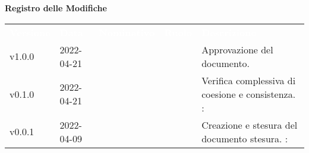 

{\LARGE{\textbf{Registro delle Modifiche}}} \\
\begin{table}[!htbp]
\renewcommand{\arraystretch}{1.5}
\begin{tabular}{ m{}<{\centering}  m{}<{\centering}  m{}<{\centering}  m{}<{\centering}  m{}<{\centering} }
	\rowcolor{darkblue}
	\textcolor{white}{\textbf{Versione}} &\textcolor{white}{\textbf{Data}}& \textcolor{white}{\textbf{Nominativo}} & \textcolor{white}{\textbf{Ruolo}}&\textcolor{white}{\textbf{Descrizione}}\\ 

	v1.0.0 & 2022-04-21 & \FP & \RE & Approvazione del documento. \\

	v0.1.0& 2022-04-21 & \PV & \AN & Verifica complessiva di coesione e consistenza.  \VE: \textit{\GC}\\

	v0.0.1& 2022-04-09 & \PV & \AN &Creazione e stesura del documento stesura.  \VE: \textit{\GC}\\

\end{tabular}
\end{table}

\pagebreak